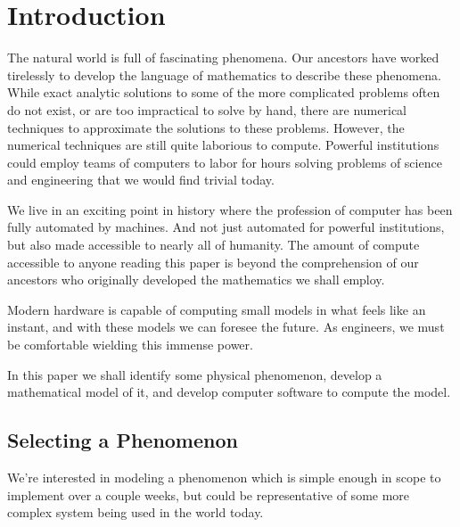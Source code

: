 \section{Introduction}

The natural world is full of fascinating phenomena. Our ancestors have worked tirelessly to develop the language of mathematics to describe these phenomena. While exact analytic solutions to some of the more complicated problems often do not exist, or are too impractical to solve by hand, there are numerical techniques to approximate the solutions to these problems. However, the numerical techniques are still quite laborious to compute. Powerful institutions could employ teams of computers to labor for hours solving problems of science and engineering that we would find trivial today. 

We live in an exciting point in history where the profession of computer has been fully automated by machines. And not just automated for powerful institutions, but also made accessible to nearly all of humanity. The amount of compute accessible to anyone reading this paper is beyond the comprehension of our ancestors who originally developed the mathematics we shall employ. 

Modern hardware is capable of computing small models in what feels like an instant, and with these models we can foresee the future. As engineers, we must be comfortable wielding this immense power. 

In this paper we shall identify some physical phenomenon, develop a mathematical model of it, and develop computer software to compute the model.

\subsection{Selecting a Phenomenon}

We're interested in modeling a phenomenon which is simple enough in scope to implement over a couple weeks, but could be representative of some more complex system being used in the world today. 

